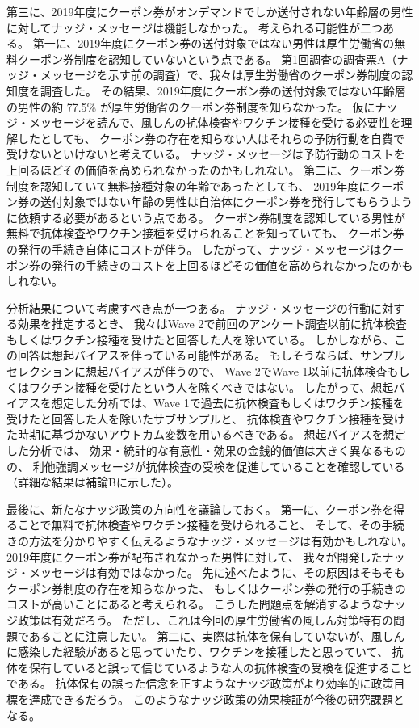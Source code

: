 \documentclass[
  11pt,
  a4paper,
]{article}
\begin{document}
第三に、2019年度にクーポン券がオンデマンドでしか送付されない年齢層の男性に対してナッジ・メッセージは機能しなかった。
考えられる可能性が二つある。
第一に、2019年度にクーポン券の送付対象ではない男性は厚生労働省の無料クーポン券制度を認知していないという点である。
第1回調査の調査票A（ナッジ・メッセージを示す前の調査）で、我々は厚生労働省のクーポン券制度の認知度を調査した。
その結果、2019年度にクーポン券の送付対象ではない年齢層の男性の約
77.5\%
が厚生労働省のクーポン券制度を知らなかった。
仮にナッジ・メッセージを読んで、風しんの抗体検査やワクチン接種を受ける必要性を理解したとしても、
クーポン券の存在を知らない人はそれらの予防行動を自費で受けないといけないと考えている。
ナッジ・メッセージは予防行動のコストを上回るほどその価値を高められなかったのかもしれない。
第二に、クーポン券制度を認知していて無料接種対象の年齢であったとしても、
2019年度にクーポン券の送付対象ではない年齢の男性は自治体にクーポン券を発行してもらうように依頼する必要があるという点である。
クーポン券制度を認知している男性が無料で抗体検査やワクチン接種を受けられることを知っていても、
クーポン券の発行の手続き自体にコストが伴う。
したがって、ナッジ・メッセージはクーポン券の発行の手続きのコストを上回るほどその価値を高められなかったのかもしれない。

分析結果について考慮すべき点が一つある。
ナッジ・メッセージの行動に対する効果を推定するとき、
我々はWave 2で前回のアンケート調査以前に抗体検査もしくはワクチン接種を受けたと回答した人を除いている。
しかしながら、この回答は想起バイアスを伴っている可能性がある。
もしそうならば、サンプルセレクションに想起バイアスが伴うので、
Wave 2でWave 1以前に抗体検査もしくはワクチン接種を受けたという人を除くべきではない。
したがって、想起バイアスを想定した分析では、Wave 1で過去に抗体検査もしくはワクチン接種を受けたと回答した人を除いたサブサンプルと、
抗体検査やワクチン接種を受けた時期に基づかないアウトカム変数を用いるべきである。
想起バイアスを想定した分析では、
効果・統計的な有意性・効果の金銭的価値は大きく異なるものの、
利他強調メッセージが抗体検査の受検を促進していることを確認している
（詳細な結果は補論Bに示した）。

最後に、新たなナッジ政策の方向性を議論しておく。
第一に、クーポン券を得ることで無料で抗体検査やワクチン接種を受けられること、
そして、その手続きの方法を分かりやすく伝えるようなナッジ・メッセージは有効かもしれない。
2019年度にクーポン券が配布されなかった男性に対して、
我々が開発したナッジ・メッセージは有効ではなかった。
先に述べたように、その原因はそもそもクーポン券制度の存在を知らなかった、
もしくはクーポン券の発行の手続きのコストが高いことにあると考えられる。
こうした問題点を解消するようなナッジ政策は有効だろう。
ただし、これは今回の厚生労働省の風しん対策特有の問題であることに注意したい。
第二に、実際は抗体を保有していないが、風しんに感染した経験があると思っていたり、ワクチンを接種したと思っていて、
抗体を保有していると誤って信じているような人の抗体検査の受検を促進することである。
抗体保有の誤った信念を正すようなナッジ政策がより効率的に政策目標を達成できるだろう。
このようなナッジ政策の効果検証が今後の研究課題となる。
\end{document}
